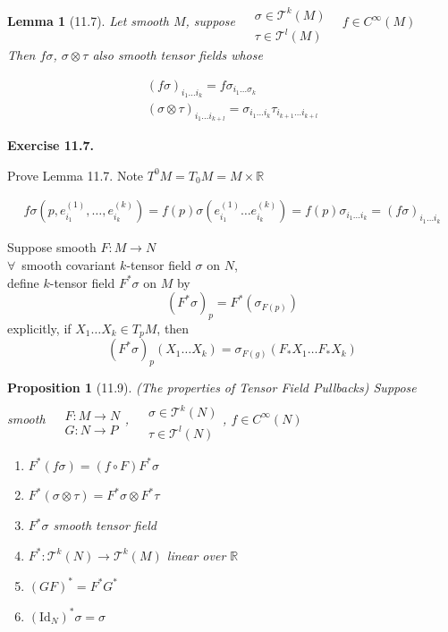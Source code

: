 \documentclass[11pt]{amsart}
\newtheorem{lemma}{Lemma}
\newtheorem{proposition}{Proposition}
\theoremstyle{definition}
\newcommand{\exercisehead}[1]{\medskip\noindent\textbf{Exercise #1.} }
\begin{document}
\begin{lemma}[11.7] Let smooth $M$, suppose $\begin{aligned} & \quad \\ & \sigma \in \mathcal{T}^k(M) \\ & \tau \in \mathcal{T}^l(M) \end{aligned}$ \quad \, $f\in C^{\infty}(M)$  \\

Then $f\sigma$, $\sigma \otimes \tau$ also smooth tensor fields whose

\[
\begin{gathered}
  (f\sigma)_{i_1 \dots i_k} = f \sigma_{i_1 \dots \sigma_k } \\
  (\sigma \otimes \tau)_{i_1 \dots i_{k+l} } = \sigma_{i_1 \dots i_k} \tau_{i_{k+1} \dots i_{k+l} }
\end{gathered}
\]
\end{lemma}

\exercisehead{11.7}

Prove Lemma 11.7.  Note $T^0M = T_0M = M \times \mathbb{R}$

\[
\begin{gathered}
  f\sigma( p, e^{(1)}_{i_1} , \dots , e^{(k)}_{i_k} ) = f(p) \sigma( e^{(1)}_{i_1} \dots e^{(k)}_{i_k} ) = f(p) \sigma_{i_1 \dots i_k} = (f\sigma)_{i_1 \dots i_k}
\end{gathered}
\]


Suppose smooth $F:M \to N$ \\
$\forall \, $ smooth covariant $k$-tensor field $\sigma$ on $N$, \\
define $k$-tensor field $F^*\sigma$ on $M$ by
\[
(F^* \sigma)_p = F^*(\sigma_{F(p)})
\]
explicitly, if $X_1 \dots X_k \in T_pM$, then
\[
(F^* \sigma)_p(X_1 \dots X_k) = \sigma_{F(g)}(F_* X_1 \dots F_* X_k)
\]


\begin{proposition}[11.9] (The properties of Tensor Field Pullbacks)
Suppose smooth $\begin{aligned} & \quad \\
  & F:M \to N \\
  & G:N \to P \end{aligned}$, \quad $\begin{aligned} & \quad \\
  & \sigma \in \mathcal{T}^k(N) \\
  & \tau \in \mathcal{T}^l(N) \end{aligned}$, \quad $f\in C^{\infty}(N)$
\begin{enumerate}
  \item[(a)] $F^*(f\sigma) = (f\circ F) F^* \sigma$
\item[(b)] $F^*(\sigma \otimes \tau) = F^*\sigma \otimes F^*\tau$
\item[(c)] $F^*\sigma$ smooth tensor field
\item[(d)] $F^*:\mathcal{T}^k(N) \to \mathcal{T}^k(M)$ linear over $\mathbb{R}$
\item[(e)] $(GF)^* = F^* G^*$
\item[(f)] $(\text{Id}_N)^*\sigma = \sigma$
\end{enumerate}
\end{proposition}
\end{document}

